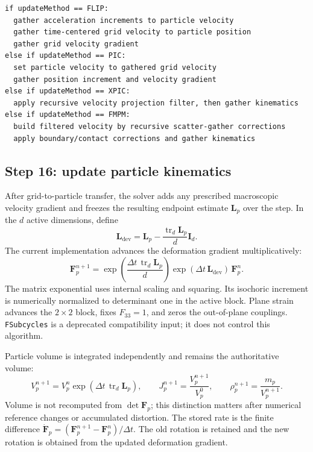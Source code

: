 \begin{lstlisting}[caption={Grid-to-particle transfer options.},basicstyle=\ttfamily\small]
if updateMethod == FLIP:
  gather acceleration increments to particle velocity
  gather time-centered grid velocity to particle position
  gather grid velocity gradient
else if updateMethod == PIC:
  set particle velocity to gathered grid velocity
  gather position increment and velocity gradient
else if updateMethod == XPIC:
  apply recursive velocity projection filter, then gather kinematics
else if updateMethod == FMPM:
  build filtered velocity by recursive scatter-gather corrections
  apply boundary/contact corrections and gather kinematics
\end{lstlisting}

\subsection{Step 16: update particle kinematics}
\label{subsec:solver-step-16}
After grid-to-particle transfer, the solver adds any prescribed macroscopic velocity gradient and freezes the resulting endpoint estimate $\mathbf L_p$ over the step. In the $d$ active dimensions, define
\begin{equation}
  \mathbf L_{\mathrm{dev}}=\mathbf L_p-\frac{\operatorname{tr}_d\mathbf L_p}{d}\mathbf I_d .
\end{equation}
The current implementation advances the deformation gradient multiplicatively:
\begin{equation}
  \mathbf F_p^{n+1}
  =\exp\!\left(\frac{\Delta t\,\operatorname{tr}_d\mathbf L_p}{d}\right)
   \exp(\Delta t\,\mathbf L_{\mathrm{dev}})\,\mathbf F_p^n .
\end{equation}
The matrix exponential uses internal scaling and squaring. Its isochoric increment is numerically normalized to determinant one in the active block. Plane strain advances the $2\times2$ block, fixes $F_{33}=1$, and zeros the out-of-plane couplings. \texttt{FSubcycles} is a deprecated compatibility input; it does not control this algorithm.

Particle volume is integrated independently and remains the authoritative volume:
\begin{equation}
  V_p^{n+1}=V_p^n\exp(\Delta t\,\operatorname{tr}_d\mathbf L_p),\qquad
  J_p^{n+1}=\frac{V_p^{n+1}}{V_p^0},\qquad
  \rho_p^{n+1}=\frac{m_p}{V_p^{n+1}} .
\end{equation}
Volume is not recomputed from $\det\mathbf F_p$; this distinction matters after numerical reference changes or accumulated distortion. The stored rate is the finite difference
$\dot{\mathbf F}_p=(\mathbf F_p^{n+1}-\mathbf F_p^n)/\Delta t$.
The old rotation is retained and the new rotation is obtained from the updated deformation gradient.


